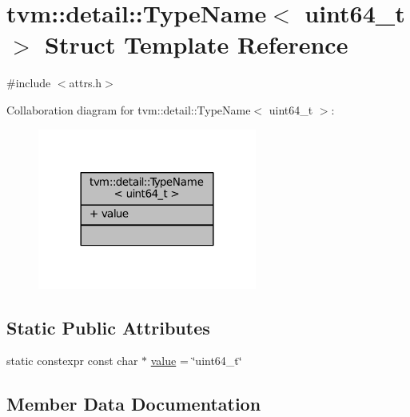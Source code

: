 \hypertarget{structtvm_1_1detail_1_1TypeName_3_01uint64__t_01_4}{}\section{tvm\+:\+:detail\+:\+:Type\+Name$<$ uint64\+\_\+t $>$ Struct Template Reference}
\label{structtvm_1_1detail_1_1TypeName_3_01uint64__t_01_4}


{\ttfamily \#include $<$attrs.\+h$>$}



Collaboration diagram for tvm\+:\+:detail\+:\+:Type\+Name$<$ uint64\+\_\+t $>$\+:
\nopagebreak
\begin{figure}[H]
\begin{center}
\leavevmode
\includegraphics[width=204pt]{structtvm_1_1detail_1_1TypeName_3_01uint64__t_01_4__coll__graph}
\end{center}
\end{figure}
\subsection*{Static Public Attributes}
\begin{DoxyCompactItemize}
\item 
static constexpr const char $\ast$ \hyperlink{structtvm_1_1detail_1_1TypeName_3_01uint64__t_01_4_a49e7cec3abbfc4db8144c7a3741b19e6}{value} = \char`\"{}uint64\+\_\+t\char`\"{}
\end{DoxyCompactItemize}


\subsection{Member Data Documentation}
